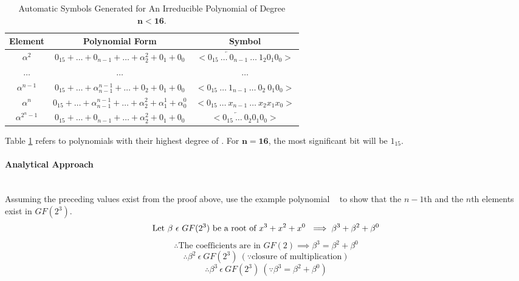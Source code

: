   \begin{table}[h]
        \def\arraystretch{2.5}
        \caption{Automatic Symbols Generated for An Irreducible Polynomial of
        Degree $\bm{n < 16}$.}
        \centering
        \begin{tabular*}{450pt}{@{\extracolsep{\fill}} ccc}

        \textbf{Element} & \textbf{Polynomial Form} & \textbf{Symbol}
        \\
        \hline

        $\alpha^{2}$ & $0_{15} + \ldots + 0_{n-1} + \ldots +
        \alpha^{2}_{2} + 0_{1} + 0_{0}$ & $< \overleftarrow{0_{15} \ \ldots \
        0_{n-1}} \ \ldots \ 1_{2} 0_{1} 0_{0} >$ \\

        $\ldots$ & $\ldots$ & $\ldots$ \\

        $\alpha^{n-1}$ & $0_{15} + \ldots + \alpha^{n-1}_{n-1} + \ldots
        + 0_{2} + 0_{1} + 0_{0}$ & $< 0_{15} \ \ldots \ 1_{n-1} \ \ldots \
          0_{2} \ 0_{1} 0_{0} >$ \\

        $\alpha^{n}$ & $0_{15} + \ldots + \alpha^{n-1}_{n-1} + \ldots
        +\alpha^{2}_{2} + \alpha^{1}_{1} + \alpha^{0}_{0}$ & $< 0_{15} \ 
        \ldots \ x_{n-1} \ \ldots \ x_{2} x_{1} x_{0} >$ \\

        $\alpha^{2^{n}-1}$ & $0_{15} + \ldots + 0_{n-1} + \ldots +
        \alpha^{2}_{2} + 0_{1} + 0_{0}$ & $< \overleftarrow{0_{15} \ \ldots \
        0_{2}} 0_{1} 0_{0} >$ \\

        \end{tabular*}
        \label{table:auto_sym}
    \end{table}

    Table \ref{table:auto_sym} refers to polynomials with their highest degree
    of \bm{$n < 15$}. For $\bm{n = 16}$, the most significant bit will be
    $1_{15}$.

        \paragraph{Analytical Approach} \leavevmode \\ Assuming the preceding
        values exist from the proof above, use the example polynomial
        \examplepoly~ to show that the $n-1$th and the $n$th elements exist in
        $GF(2^{3})$.
        \[ \text{Let } \beta \ \epsilon \ GF(2^{3}) \text{ be a root of
        $x^{3}+x^{2}+x^{0}$~} \implies \beta^{3} + \beta^{2} + \beta^{0} \]
        \[ \therefore \text{The coefficients are in } GF(2) \implies
        \beta^{3} = \beta^{2} + \beta^{0} \]
        \[ \therefore \beta^{2} \ \epsilon \ GF(2^{3}) \ (\because \text{
        closure of  multiplication}) \]
        \[ \therefore \beta^{3} \ \epsilon \ GF(2^{3}) \ (\because \beta^{3} =
        \beta^{2} + \beta^{0}) \]

